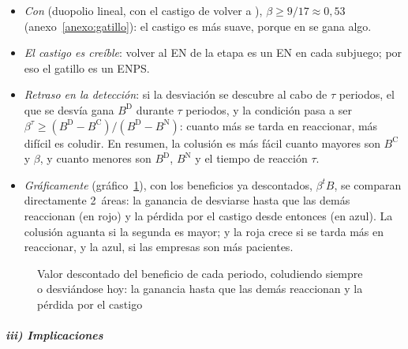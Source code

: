 \documentclass[11pt]{article}
\begin{document}
\begin{itemize}
  \[
  \beta\;\geq\;1-\frac{1}{n},
  \]
  que en el duopolio es $\beta\geq1/2$. Con más empresas hace falta más paciencia: cada una se lleva menos del beneficio colusorio y gana lo mismo desviándose.
\item \emph{Con } (duopolio lineal, con el castigo de volver a ), $\beta\geq9/17\approx0{,}53$ (anexo~\ref{anexo:gatillo}): el castigo es más suave, porque en  se gana algo.
\item \emph{El castigo es creíble}: volver al EN de la etapa es un EN en cada subjuego; por eso el gatillo es un ENPS.
\item \emph{Retraso en la detección}: si la desviación se descubre al cabo de $\tau$ periodos, el que se desvía gana $B^{\mathrm D}$ durante $\tau$ periodos, y la condición pasa a ser $\beta^{\tau}\geq(B^{\mathrm D}-B^{\mathrm C})/(B^{\mathrm D}-B^{\mathrm N})$: cuanto más se tarda en reaccionar, más difícil es coludir. En resumen, la colusión es más fácil cuanto mayores son $B^{\mathrm C}$ y $\beta$, y cuanto menores son $B^{\mathrm D}$, $B^{\mathrm N}$ y el tiempo de reacción $\tau$.
\item \emph{Gráficamente} (gráfico~\ref{fig:colusion-tiempo}), con los beneficios ya descontados, $\beta^tB$, se comparan directamente 2~áreas: la ganancia de desviarse hasta que las demás reaccionan (en rojo) y la pérdida por el castigo desde entonces (en azul). La colusión aguanta si la segunda es mayor; y la roja crece si se tarda más en reaccionar, y la azul, si las empresas son más pacientes.
\end{itemize}

\begin{figure}[H]
\centering
\caption{Valor descontado del beneficio de cada periodo, coludiendo siempre o desviándose hoy: la ganancia hasta que las demás reaccionan y la pérdida por el castigo}\label{fig:colusion-tiempo}
\end{figure}

\subparagraph{iii) Implicaciones}
\end{document}
